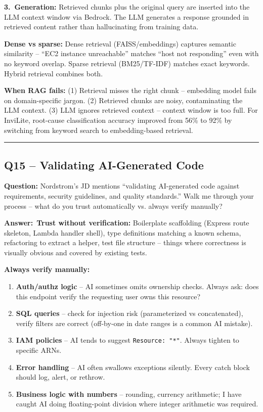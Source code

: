 \documentclass[letterpaper,10pt]{article}
\newlength{\boxwidth}
\newcommand{\questionbox}[1]{%
  \vspace{6pt}%
  \noindent\colorbox{qbg}{%
    \begin{minipage}{\boxwidth}%
      \vspace{3pt}\textbf{\textcolor{nordblue}{Question:}} #1\vspace{3pt}%
    \end{minipage}%
  }\vspace{2pt}%
}
\newcommand{\answerlabel}{\noindent\textbf{\textcolor{answerblue}{Answer:}}~}
\begin{document}
\textbf{3.~Generation:} Retrieved chunks plus the original query are inserted into the LLM context window via Bedrock. The LLM generates a response grounded in retrieved content rather than hallucinating from training data.

\textbf{Dense vs sparse:} Dense retrieval (FAISS/embeddings) captures semantic similarity -- ``EC2 instance unreachable'' matches ``host not responding'' even with no keyword overlap. Sparse retrieval (BM25/TF-IDF) matches exact keywords. Hybrid retrieval combines both.

\textbf{When RAG fails:} (1) Retrieval misses the right chunk -- embedding model fails on domain-specific jargon. (2) Retrieved chunks are noisy, contaminating the LLM context. (3) LLM ignores retrieved context -- context window is too full. For InviLite, root-cause classification accuracy improved from 56\% to 92\% by switching from keyword search to embedding-based retrieval.

\medskip\rule{\linewidth}{0.2pt}

\subsection*{Q15 -- Validating AI-Generated Code}

\questionbox{Nordstrom's JD mentions ``validating AI-generated code against requirements, security guidelines, and quality standards.'' Walk me through your process -- what do you trust automatically vs. always verify manually?}

\answerlabel \textbf{Trust without verification:} Boilerplate scaffolding (Express route skeleton, Lambda handler shell), type definitions matching a known schema, refactoring to extract a helper, test file structure -- things where correctness is visually obvious and covered by existing tests.

\textbf{Always verify manually:}
\begin{enumerate}[leftmargin=*, itemsep=0pt]
  \item \textbf{Auth/authz logic} -- AI sometimes omits ownership checks. Always ask: does this endpoint verify the requesting user owns this resource?
  \item \textbf{SQL queries} -- check for injection risk (parameterized vs concatenated), verify filters are correct (off-by-one in date ranges is a common AI mistake).
  \item \textbf{IAM policies} -- AI tends to suggest \texttt{Resource: "*"}. Always tighten to specific ARNs.
  \item \textbf{Error handling} -- AI often swallows exceptions silently. Every catch block should log, alert, or rethrow.
  \item \textbf{Business logic with numbers} -- rounding, currency arithmetic; I have caught AI doing floating-point division where integer arithmetic was required.
\end{enumerate}
\end{document}
